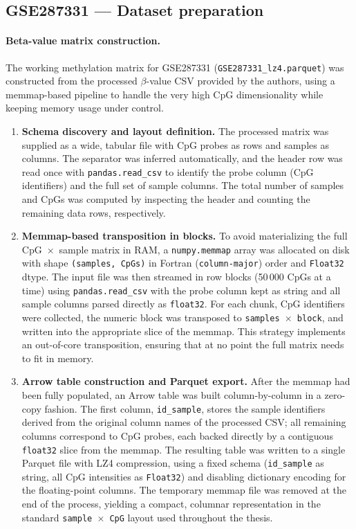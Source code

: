 \documentclass[10pt]{extarticle}
\begin{document}
\subsection{GSE287331 — Dataset preparation}

\paragraph{Beta-value matrix construction.}
The working methylation matrix for GSE287331 (\texttt{GSE287331\_lz4.parquet}) was constructed from the processed $\beta$-value CSV provided by the authors, using a memmap-based pipeline to handle the very high CpG dimensionality while keeping memory usage under control.
\begin{enumerate}[label=\arabic*)]
  \item \textbf{Schema discovery and layout definition.}  
  The processed matrix was supplied as a wide, tabular file with CpG probes as rows and samples as columns.  
  The separator was inferred automatically, and the header row was read once with \texttt{pandas.read\_csv} to identify the probe column (CpG identifiers) and the full set of sample columns.  
  The total number of samples and CpGs was computed by inspecting the header and counting the remaining data rows, respectively.

  \item \textbf{Memmap-based transposition in blocks.}  
  To avoid materializing the full CpG~$\times$~sample matrix in RAM, a \texttt{numpy.memmap} array was allocated on disk with shape \texttt{(samples, CpGs)} in Fortran (\texttt{column-major}) order and \texttt{Float32} dtype.  
  The input file was then streamed in row blocks (50\,000 CpGs at a time) using \texttt{pandas.read\_csv} with the probe column kept as string and all sample columns parsed directly as \texttt{float32}.  
  For each chunk, CpG identifiers were collected, the numeric block was transposed to \texttt{samples~$\times$~block}, and written into the appropriate slice of the memmap.  
  This strategy implements an out-of-core transposition, ensuring that at no point the full matrix needs to fit in memory.

  \item \textbf{Arrow table construction and Parquet export.}  
  After the memmap had been fully populated, an Arrow table was built column-by-column in a zero-copy fashion.  
  The first column, \texttt{id\_sample}, stores the sample identifiers derived from the original column names of the processed CSV; all remaining columns correspond to CpG probes, each backed directly by a contiguous \texttt{float32} slice from the memmap.  
  The resulting table was written to a single Parquet file with LZ4 compression, using a fixed schema (\texttt{id\_sample} as string, all CpG intensities as \texttt{Float32}) and disabling dictionary encoding for the floating-point columns.  
  The temporary memmap file was removed at the end of the process, yielding a compact, columnar representation in the standard \texttt{sample~$\times$~CpG} layout used throughout the thesis.
\end{enumerate}
\end{document}
